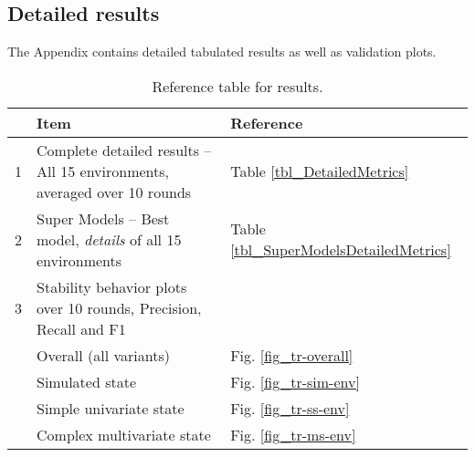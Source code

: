 \documentclass[referee, sn-mathphys-num]{sn-jnl}
\newcommand{\rowspace}[1]{\renewcommand{\arraystretch}{#1}}
\newcommand{\ltmidrule} {\arrayrulecolor{black!20} \midrule}
\begin{document}
	
	\bigskip
	\bigskip
	\begin{appendices}
		\setcounter{table}{0}
		\renewcommand\theHtable{Appendix.\thetable}
		\setcounter{figure}{0}
		\renewcommand\theHfigure{Appendix.\thefigure}
		
		\section{Detailed results}\label{apx}
		The Appendix contains detailed tabulated results as well as validation plots.
		\begin{table}[!h]
			\rowspace{1.6}
			\caption{Reference table for results.}\label{tbl_apx_results}
			{\begin{tabular}{R{0.25cm} L{11.5cm} L{3cm}}
					\toprule 			
					& Item & Reference\\ \midrule
					
					1 & Complete detailed results -- All 15 environments, averaged over 10 rounds & Table \ref{tbl_DetailedMetrics}\\\ltmidrule
					
					2 & Super Models -- Best model, \textit{details} of all 15 environments & Table \ref{tbl_SuperModelsDetailedMetrics}\\\ltmidrule
					
					3 & Stability behavior plots over 10 rounds, Precision, Recall and F1\\
					& \quad\quad Overall (all variants)  & Fig. \ref{fig_tr-overall}\\
					& \quad\quad Simulated state & Fig. \ref{fig_tr-sim-env}\\
					& \quad\quad Simple univariate state & Fig. \ref{fig_tr-ss-env}\\
					& \quad\quad Complex multivariate state & Fig. \ref{fig_tr-ms-env}\\
					\bottomrule
			\end{tabular}}
		\end{table}
		

\end{appendices}
\end{document}
